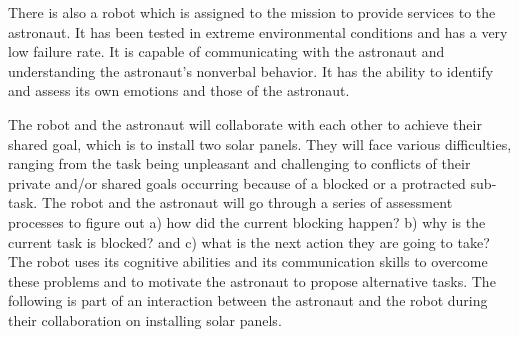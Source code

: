 \documentclass[12pt]{report}
\begin{document}
There is also a robot which is assigned to the mission to provide services to
the astronaut. It has been tested in extreme environmental conditions and has
a very low failure rate. It is capable of communicating with the astronaut and
understanding the astronaut's nonverbal behavior. It has the ability to identify
and assess its own emotions and those of the astronaut.

The robot and the astronaut will collaborate with each other to achieve their
shared goal, which is to install two solar panels. They will face various
difficulties, ranging from the task being unpleasant and challenging to
conflicts of their private and/or shared goals occurring because of a blocked or
a protracted sub-task. The robot and the astronaut will go through a series of
assessment processes to figure out a) how did the current blocking happen? b)
why is the current task is blocked? and c) what is the next action they are
going to take? The robot uses its cognitive abilities and its communication
skills to overcome these problems and to motivate the astronaut to propose
alternative tasks. The following is part of an interaction between the astronaut
and the robot during their collaboration on installing solar panels.
\end{document}

